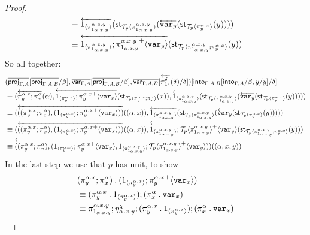 \documentclass[10pt]{article}
\theoremstyle{definition}
\newcommand{\rewrite}[2]{\overleftarrow{#1}(#2)}
\newcommand\StI[2]{\ensuremath{\mathsf{st}_{#1}(#2)}}
\newcommand\ApEl[2]{\mathcal{T}_{#1}\langle#2\rangle}
\newcommand\bdot[0]{\mathbin{.}}
\newcommand\ApPlus[2]{\ensuremath{{#1}^+ \langle #2 \rangle }}
\begin{document}
\begin{proof}
\begin{align*}
&\equiv \rewrite{\ApOne{\pi^{\alpha.x.y}_{1_{\alpha.x.y}}}}{\StI{\ApEl{p}{\pi^{\alpha.x.y}_{1_{\alpha.x.y}}}}{\rewrite{\var{y}}{\StI{\ApEl{p}{\pi^{\alpha.x}_y}}{y}}}} \\
&\equiv \rewrite{\ApOne{\pi^{\alpha.x.y}_{1_{\alpha.x.y}}};\ApPlus{\pi^{\alpha.x.y}_{1_{\alpha.x.y}}}{\var{y}}}{\StI{\ApEl{p}{\pi^{\alpha.x.y}_{1_{\alpha.x.y}};\pi^{\alpha.x}_y}}{y}}
\end{align*}
So all together:
\begin{align*}
&(\upstairs{\proj{\Gamma, A}}[\upstairs{\proj{\Gamma, A, B}}/\beta], \upstairs{\qvar{\Gamma, A}}[\upstairs{\proj{\Gamma, A, B}}/\beta], \upstairs{\qvar{\Gamma, A, B}}[\rewrite{\pi^\delta_{1_\delta}}{\delta}/\delta])[\into{\Gamma, A, B}[\into{\Gamma, A}/\beta, y/y]/\delta] \\
&\equiv (\rewrite{\pi^{\alpha.x}_y;\pi^\alpha_x}{\alpha}, \rewrite{\ApOne{\pi^{\alpha.x}_y};\ApPlus{\pi^{\alpha.x}_y}{\var{x}}}{\StI{\ApEl{p}{\pi^{\alpha.x}_y;\pi^{\alpha}_x}}{x}}, \rewrite{\ApOne{\pi^{\alpha.x.y}_{1_{\alpha.x.y}}}}{\StI{\ApEl{p}{\pi^{\alpha.x.y}_{1_{\alpha.x.y}}}}{\rewrite{\var{y}}{\StI{\ApEl{p}{\pi^{\alpha.x}_y}}{y}}}}) \\
&\equiv (\rewrite{((\pi^{\alpha.x}_y;\pi^\alpha_x), (\ApOne{\pi^{\alpha.x}_y};\ApPlus{\pi^{\alpha.x}_y}{\var{x}}))}{(\alpha, x)}, \rewrite{\ApOne{\pi^{\alpha.x.y}_{1_{\alpha.x.y}}}}{\StI{\ApEl{p}{\pi^{\alpha.x.y}_{1_{\alpha.x.y}}}}{\rewrite{\var{y}}{\StI{\ApEl{p}{\pi^{\alpha.x}_y}}{y}}}}) \\
&\equiv (\rewrite{((\pi^{\alpha.x}_y;\pi^\alpha_x), (\ApOne{\pi^{\alpha.x}_y};\ApPlus{\pi^{\alpha.x}_y}{\var{x}}))}{(\alpha, x)}, \rewrite{\ApOne{\pi^{\alpha.x.y}_{1_{\alpha.x.y}}};\ApPlus{\ApEl{p}{\pi^{\alpha.x.y}_{1_{\alpha.x.y}}}}{\var{y}}}{\StI{\ApEl{p}{\pi^{\alpha.x.y}_{1_{\alpha.x.y}};\pi^{\alpha.x}_y}}{y}}) \\
&\equiv \rewrite{((\pi^{\alpha.x}_y;\pi^\alpha_x), (\ApOne{\pi^{\alpha.x}_y};\ApPlus{\pi^{\alpha.x}_y}{\var{x}}, \ApOne{\pi^{\alpha.x.y}_{1_{\alpha.x.y}}};\ApPlus{\ApEl{p}{\pi^{\alpha.x.y}_{1_{\alpha.x.y}}}}{\var{y}}))}{(\alpha, x,y)}
\end{align*}
In the last step we use that $p$ has unit, to show
\begin{align*}
&(\pi^{\alpha.x}_y;\pi^\alpha_x) \bdot (\ApOne{\pi^{\alpha.x}_y};\ApPlus{\pi^{\alpha.x}_y}{\var{x}}) \\
&\equiv (\pi^{\alpha.x}_y \bdot \ApOne{\pi^{\alpha.x}_y});(\pi^\alpha_x \bdot \var{x}) \\
&\equiv \pi^{\alpha.x.y}_{1_{\alpha.x.y}};\eta^\chi_{\alpha.x.y};(\pi^{\alpha.x}_y \bdot \ApOne{\pi^{\alpha.x}_y});(\pi^\alpha_x \bdot \var{x}) \\

\end{align*}
\end{proof}
\end{document}
